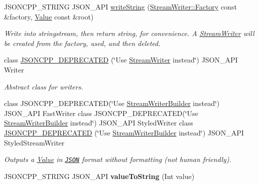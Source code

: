 \begin{DoxyCompactItemize}
\mbox{\label{namespaceJson_a00820c0084189e2a7533531c0f250e3f}} 
J\+S\+O\+N\+C\+P\+P\+\_\+\+S\+T\+R\+I\+NG J\+S\+O\+N\+\_\+\+A\+PI \hyperlink{namespaceJson_a00820c0084189e2a7533531c0f250e3f}{write\+String} (\hyperlink{classJson_1_1StreamWriter_1_1Factory}{Stream\+Writer\+::\+Factory} const \&factory, \hyperlink{classJson_1_1Value}{Value} const \&root)
\begin{DoxyCompactList}\small\item\em Write into stringstream, then return string, for convenience. A \hyperlink{classJson_1_1StreamWriter}{Stream\+Writer} will be created from the factory, used, and then deleted. \end{DoxyCompactList}\item 
class \hyperlink{namespaceJson_a677dd20047c0c6e4eb16c5f1b53f703c}{J\+S\+O\+N\+C\+P\+P\+\_\+\+D\+E\+P\+R\+E\+C\+A\+T\+ED} (\char`\"{}Use \hyperlink{classJson_1_1StreamWriter}{Stream\+Writer} instead\char`\"{}) J\+S\+O\+N\+\_\+\+A\+PI Writer
\begin{DoxyCompactList}\small\item\em Abstract class for writers. \end{DoxyCompactList}\item 
class J\+S\+O\+N\+C\+P\+P\+\_\+\+D\+E\+P\+R\+E\+C\+A\+T\+ED(\char`\"{}Use \hyperlink{classJson_1_1StreamWriterBuilder}{Stream\+Writer\+Builder} instead\char`\"{}) J\+S\+O\+N\+\_\+\+A\+PI Fast\+Writer class J\+S\+O\+N\+C\+P\+P\+\_\+\+D\+E\+P\+R\+E\+C\+A\+T\+ED(\char`\"{}Use \hyperlink{classJson_1_1StreamWriterBuilder}{Stream\+Writer\+Builder} instead\char`\"{}) J\+S\+O\+N\+\_\+\+A\+PI Styled\+Writer class \hyperlink{namespaceJson_a9013c5f4f4ff260225b101a18af45262}{J\+S\+O\+N\+C\+P\+P\+\_\+\+D\+E\+P\+R\+E\+C\+A\+T\+ED} (\char`\"{}Use \hyperlink{classJson_1_1StreamWriterBuilder}{Stream\+Writer\+Builder} instead\char`\"{}) J\+S\+O\+N\+\_\+\+A\+PI Styled\+Stream\+Writer
\begin{DoxyCompactList}\small\item\em Outputs a \hyperlink{classJson_1_1Value}{Value} in \href{http://www.json.org}{\tt J\+S\+ON} format without formatting (not human friendly). \end{DoxyCompactList}\item 
\mbox{\label{namespaceJson_a4ed9732688b3c3dcaec309c9baddeac9}} 
J\+S\+O\+N\+C\+P\+P\+\_\+\+S\+T\+R\+I\+NG J\+S\+O\+N\+\_\+\+A\+PI {\bfseries value\+To\+String} (Int value)
\item 

\end{DoxyCompactItemize}
